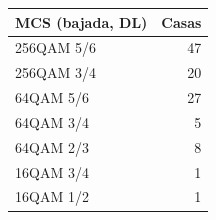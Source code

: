 \begin{tabular}{lr}\toprule MCS (bajada, DL) & Casas\\\midrule
256QAM 5/6 & 47\\
256QAM 3/4 & 20\\
64QAM 5/6 & 27\\
64QAM 3/4 & 5\\
64QAM 2/3 & 8\\
16QAM 3/4 & 1\\
16QAM 1/2 & 1\\\bottomrule\end{tabular}
